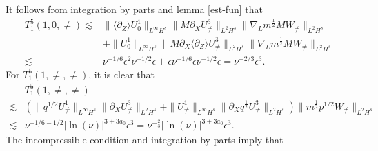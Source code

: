 \documentclass[12pt]{article}
\newcommand{\wtb}{\langle\partial_Z\rangle }
\numberwithin{equation}{section}
\begin{document}
	It follows from integration by parts and lemma \ref{est-fun} that
	\begin{align*}
		T^5_1(1,0,\neq)\lesssim&\| \wtb U^1_0\|_{L^\infty H^s}\|M\partial_X U^3_{\neq}\|_{L^2H^s}\|\nabla_L m^{\frac{1}{2}}M W_{\neq}\|_{L^2H^s}\\
		&+\|U^1_0\|_{L^\infty H^s}\|M\partial_X \wtb U^3_{\neq}\|_{L^2H^s}\|\nabla_L m^{\frac{1}{2}}M W_{\neq}\|_{L^2H^s}\\
        \lesssim&\nu^{-1/6}\epsilon^2\nu^{-1/2}\epsilon+\epsilon\nu^{-1/6}\epsilon\nu^{-1/2}\epsilon=\nu^{-2/3}\epsilon^3.
	\end{align*}
	For $T^5_1(1,\neq,\neq)$, it is clear that
    \begin{align*}
		&T^5_1(1,\neq,\neq)\\
		\lesssim&
		\left( \|q^{1/2} U^1_{\neq}\|_{L^{\infty} H^s}\|\partial_X  U^3_{\neq}\|_{L^2H^s}
		+\|U^1_{\neq}\|_{L^{\infty} H^s}\|\partial_X q^{\frac{1}{2}} U^3_{\neq}\|_{L^2H^s} \right) \|m^{\frac{1}{2}}  p^{1/2} W_{\neq}\|_{L^2 H^{s}}\\
		\lesssim& \nu^{-1/6-1/2}|\ln(\nu)|^{3+3a_0}\epsilon^3= \nu^{-\frac{2}{3}}|\ln(\nu)|^{3+3a_0}\epsilon^3.
	\end{align*}
	The incompressible condition and integration by parts imply that
\end{document}
